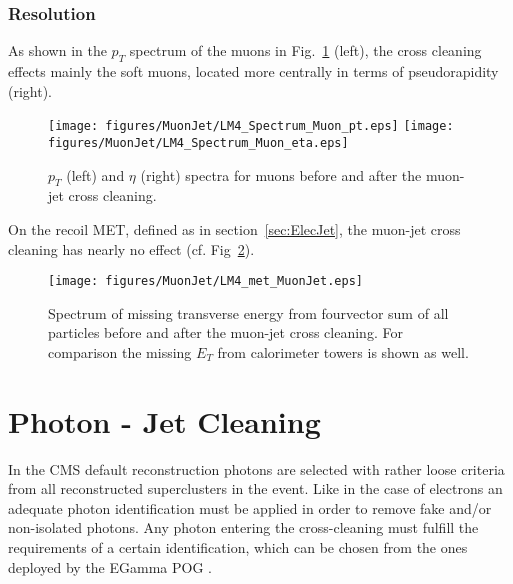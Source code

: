 \documentclass{cmspaper}
\begin{document}
\subsubsection{Resolution}
As shown in the \(p_T\) spectrum of the muons in
Fig.~\ref{fig:ObjSpectra_MuonJet} (left), the cross cleaning effects mainly
the soft muons, located more centrally in terms of pseudorapidity (right).

\begin{figure}[hb]
\begin{center}
    \texttt{[image: figures/MuonJet/LM4\_Spectrum\_Muon\_pt.eps]}
    \texttt{[image: figures/MuonJet/LM4\_Spectrum\_Muon\_eta.eps]}
    \caption{\(p_T\) (left) and \(\eta\) (right) spectra for muons before and
    after the muon-jet cross cleaning.}
\label{fig:ObjSpectra_MuonJet}
\end{center}
\end{figure} 

On the recoil MET, defined as in section~\ref{sec:ElecJet}, the muon-jet cross
cleaning has nearly no effect (cf. Fig~\ref{fig:met_MuonJet}).

\begin{figure}[hb]
\begin{center}
    \texttt{[image: figures/MuonJet/LM4\_met\_MuonJet.eps]}
    \caption{Spectrum of missing transverse energy from fourvector sum of all
    particles before and after the muon-jet cross cleaning. For comparison the
    missing $E_T$ from calorimeter towers is shown as well.}
\label{fig:met_MuonJet}
\end{center}
\end{figure}

\clearpage


\section{Photon - Jet Cleaning}
In the CMS default reconstruction photons are selected with rather loose
criteria from all reconstructed superclusters in the event. Like in the case of
electrons an adequate photon identification must be applied in order to remove
fake and/or non-isolated photons. Any photon entering the cross-cleaning must
fulfill the requirements of a certain identification, which can be chosen from
the ones deployed by the EGamma POG \cite{photonID}. 
\end{document}
